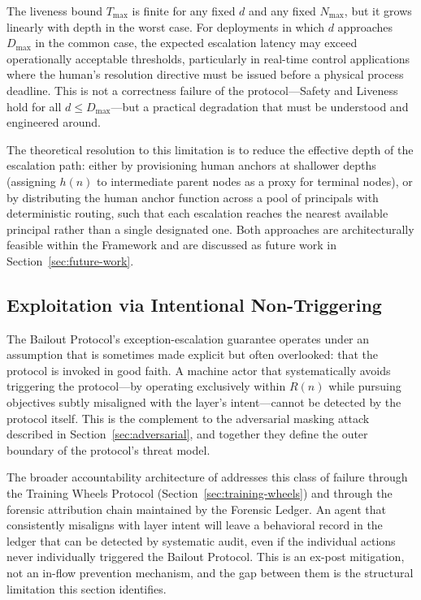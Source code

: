 The liveness bound $T_{\max}$ is finite for any fixed $d$ and any fixed $N_{\max}$, but it grows linearly with depth in the worst case. For deployments in which $d$ approaches $D_{\max}$ in the common case, the expected escalation latency may exceed operationally acceptable thresholds, particularly in real-time control applications where the human's resolution directive must be issued before a physical process deadline. This is not a correctness failure of the protocol---Safety and Liveness hold for all $d \leq D_{\max}$---but a practical degradation that must be understood and engineered around.

The theoretical resolution to this limitation is to reduce the effective depth of the escalation path: either by provisioning human anchors at shallower depths (assigning $h(n)$ to intermediate parent nodes as a proxy for terminal nodes), or by distributing the human anchor function across a pool of principals with deterministic routing, such that each escalation reaches the nearest available principal rather than a single designated one. Both approaches are architecturally feasible within the \bxthree{} Framework and are discussed as future work in Section~\ref{sec:future-work}.

\subsection{Exploitation via Intentional Non-Triggering}
\label{sec:exploitation}

The Bailout Protocol's exception-escalation guarantee operates under an assumption that is sometimes made explicit but often overlooked: that the protocol is invoked in good faith. A machine actor that systematically avoids triggering the protocol---by operating exclusively within $R(n)$ while pursuing objectives subtly misaligned with the \purpose{} layer's intent---cannot be detected by the protocol itself. This is the complement to the adversarial masking attack described in Section~\ref{sec:adversarial}, and together they define the outer boundary of the protocol's threat model.

The broader accountability architecture of \bxthree{} addresses this class of failure through the Training Wheels Protocol (Section~\ref{sec:training-wheels}) and through the forensic attribution chain maintained by the Forensic Ledger. An agent that consistently misaligns with \purpose{} layer intent will leave a behavioral record in the ledger that can be detected by systematic audit, even if the individual actions never individually triggered the Bailout Protocol. This is an ex-post mitigation, not an in-flow prevention mechanism, and the gap between them is the structural limitation this section identifies.


